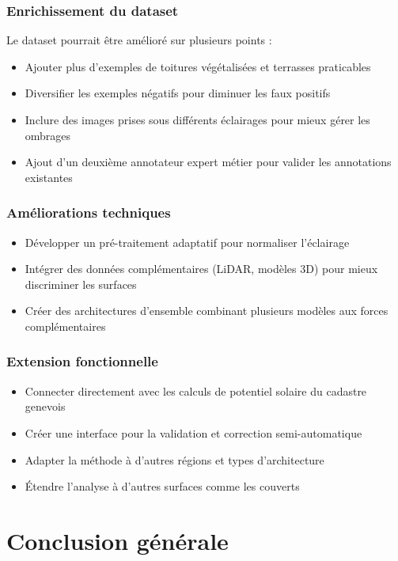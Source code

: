 \subsubsection{Enrichissement du dataset}
Le dataset pourrait être amélioré sur plusieurs points :
\begin{itemize}
    \item Ajouter plus d'exemples de toitures végétalisées et terrasses praticables
    \item Diversifier les exemples négatifs pour diminuer les faux positifs
    \item Inclure des images prises sous différents éclairages pour mieux gérer les ombrages
    \item Ajout d'un deuxième annotateur expert métier pour valider les annotations existantes
\end{itemize}

\subsubsection{Améliorations techniques}
\begin{itemize}
    \item Développer un pré-traitement adaptatif pour normaliser l'éclairage
    \item Intégrer des données complémentaires (LiDAR, modèles 3D) pour mieux discriminer les surfaces
    \item Créer des architectures d'ensemble combinant plusieurs modèles aux forces complémentaires
\end{itemize}

\subsubsection{Extension fonctionnelle}
\begin{itemize}
    \item Connecter directement avec les calculs de potentiel solaire du cadastre genevois
    \item Créer une interface pour la validation et correction semi-automatique
    \item Adapter la méthode à d'autres régions et types d'architecture
    \item Étendre l'analyse à d'autres surfaces comme les couverts
\end{itemize}

\section{Conclusion générale}

